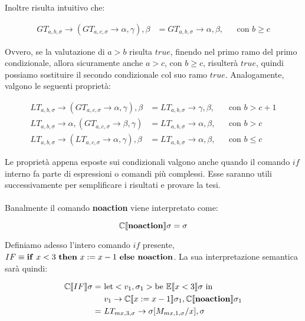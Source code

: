     Inoltre risulta intuitivo che:
    
    \begin{align*}
        GT_{a,b,\sigma} \rightarrow (GT_{a,c,\sigma} \rightarrow \alpha, \gamma), \beta &= GT_{a,b,\sigma} \rightarrow \alpha, \beta, &&\mbox{con $b\geq c$}
    \end{align*}
    
    Ovvero, se la valutazione di $a>b$ risulta $true$, finendo nel primo ramo del primo condizionale, allora sicuramente anche $a>c$, con $b \geq c$, risulterà $true$, quindi possiamo sostituire il secondo condizionale col suo ramo $true$. Analogamente, valgono le seguenti proprietà:
    
    \begin{align*}
        LT_{a,b,\sigma} \rightarrow (GT_{a,c,\sigma} \rightarrow \alpha, \gamma), \beta &= LT_{a,b,\sigma} \rightarrow \gamma, \beta, &&\mbox{con $b > c+1$}\\
        LT_{a,b,\sigma} \rightarrow \alpha, (GT_{a,c,\sigma} \rightarrow \beta, \gamma) &= LT_{a,b,\sigma} \rightarrow \alpha, \beta, &&\mbox{con $b > c$}\\
        LT_{a,b,\sigma} \rightarrow (LT_{a,c,\sigma} \rightarrow \alpha, \gamma), \beta &= LT_{a,b,\sigma} \rightarrow \alpha, \beta, &&\mbox{con $b\leq c$}
    \end{align*}
    
    Le proprietà appena esposte sui condizionali valgono anche quando il comando $if$ interno fa parte di espressioni o comandi più complessi. Esse saranno utili successivamente per semplificare i risultati e provare la tesi.\\
    \\
    Banalmente il comando \textbf{noaction} viene interpretato come:
    
    \begin{equation*}
        \mathbb{C}\llbracket \mbox{\textbf{noaction}} \rrbracket\sigma = \sigma
    \end{equation*}
    
    Definiamo adesso l'intero comando $if$ presente, $IF \equiv \mbox{\textbf{if}}\ x<3\ \mbox{\textbf{then}}\ x:=x-1\ \mbox{\textbf{else noaction}}$. La sua interpretazione semantica sarà quindi:
    
    \begin{align*}
        \mathbb{C}\doublebracket{IF}\sigma =\ & \mbox{let} <v_1,\sigma_1> \mbox{be}\ \mathbb{E}\doublebracket{x<3}\sigma\ \mbox{in}\\
        & v_1\rightarrow\mathbb{C}\doublebracket{x:=x-1}\sigma_1,\mathbb{C}\doublebracket{\mbox{\textbf{noaction}}}\sigma_1\\
        =\ & LT_{mx,3,\sigma}\rightarrow \sigma[M_{mx,1,\sigma}/x], \sigma
    \end{align*}
    
